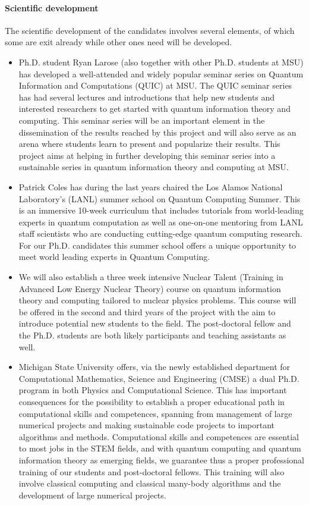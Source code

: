 \documentclass[10pt]{article}
\begin{document}
\paragraph{Scientific development}
The scientific development of the candidates involves several elements, of which some are exit already while other ones need will be developed. 
\begin{itemize}
    \item Ph.D. student Ryan Larose (also together with other Ph.D. students at MSU) has developed a well-attended and widely popular seminar series on Quantum Information and Computations (QUIC) at MSU. The QUIC seminar series has had  several lectures and introductions that help new students and interested researchers to get started with quantum information theory and computing. This seminar series will be an important element in the dissemination of the results reached by this project and will also serve as an arena where students learn to present and popularize their results.  This project aims at helping in further developing this seminar series into a sustainable series in quantum information theory and computing at MSU. 
    \item Patrick Coles has during the last years chaired the Los Alamos National Laboratory's (LANL) summer school on Quantum Computing Summer. This is an immersive 10-week curriculum that includes tutorials from world-leading experts in quantum computation as well as one-on-one mentoring from LANL staff scientists who are conducting cutting-edge quantum computing research. For our Ph.D. candidates this summer school offers a unique opportunity to meet world leading experts in Quantum Computing. 
    \item We will also establish a three week intensive Nuclear Talent (Training in Advanced Low Energy Nuclear Theory) course on quantum information theory and computing tailored to nuclear physics problems. This course will be offered in the second and third years of the project with the aim to introduce potential new students to the field. The post-doctoral fellow and the Ph.D. students are both likely participants and teaching assistants as well.
    \item Michigan State University offers, via the newly established department for Computational Mathematics, Science and Engineering (CMSE) a dual Ph.D. program in both Physics and Computational Science. This has important consequences for the possibility to establish a proper educational path in computational skills and competences, spanning from management of large numerical projects and making sustainable code projects to important algorithms and methods. Computational skills and competences are essential to most jobs in the STEM fields, and with quantum computing and quantum information theory as emerging fields, we guarantee thus a proper professional training of our students and post-doctoral fellows. This training will also involve classical computing and classical many-body algorithms and the development of large numerical projects.

\end{itemize}
\end{document}
